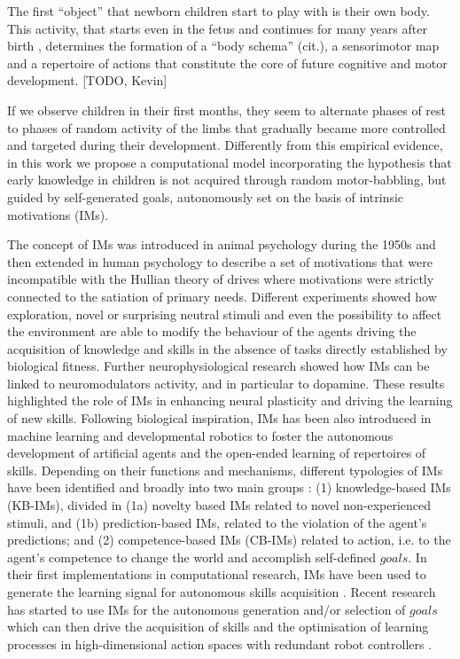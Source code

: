 The first ``object'' that newborn children start to play with is their own body. This activity, that starts even in the fetus and continues for many years after birth \citep{Bremner2008}, determines the formation of a ``body schema'' (cit.), a sensorimotor map and a repertoire of actions that constitute the core of future cognitive and motor development. [TODO, Kevin]

If we observe children in their first months, they seem to alternate phases of rest to phases of random activity of the limbs that gradually became more controlled and targeted during their development. Differently from this empirical evidence, in this work we propose a computational model incorporating the hypothesis that early knowledge in children is not acquired through random motor-babbling, but guided by self-generated goals, autonomously set on the basis of intrinsic motivations (IMs).

The concept of IMs was introduced in animal psychology during the 1950s and then extended in human psychology \citep{Berlyne1950,White1959,Berlyne1960,deci1985,Ryan2000}  to describe a set of motivations that were incompatible with the Hullian theory of drives \citep{Hull1943} where motivations were strictly connected to the satiation of primary needs. Different experiments \citep[e.g.][]{Harlow1950,Montgomery1954,Kish1955,Glow1978} showed how exploration, novel or surprising neutral stimuli and even the possibility to affect the environment are able to modify the behaviour of the agents driving the acquisition of knowledge and skills in the absence of tasks directly established by biological fitness. Further neurophysiological research \citep[e.g.][]{Chiodo1980,Horvitz2000,Redgrave2006} showed how IMs can be linked to neuromodulators activity, and in particular to dopamine. These results highlighted the role of IMs in enhancing neural plasticity and driving the learning of new skills. Following biological inspiration, IMs has been also introduced in machine learning \citep[e.g.][]{Barto2004,Schmidhuber2010} and developmental robotics \citep[e.g.][]{Oudeyer2007a,BaldassarreMirolliBook} to foster the autonomous development of artificial agents and the open-ended learning of repertoires of skills. Depending on their functions and mechanisms, different typologies of IMs have been identified \citep{Oudeyer2007b,Santucci2013a,Barto2013} and broadly into two main groups \citep{Baldassarre2014}: (1) knowledge-based IMs (KB-IMs), divided in (1a) novelty based IMs related to novel non-experienced stimuli, and (1b) prediction-based IMs, related to the violation of the agent's predictions; and (2) competence-based IMs (CB-IMs) related to action, i.e. to the agent's competence to change the world and accomplish self-defined $goals$. In their first implementations in computational research, IMs have been used to generate the learning signal for autonomous skills acquisition \citep{Oudeyer2007a,Hart2011,Mirolli2013,Kompella2015}. Recent research has started to use IMs for the autonomous generation and/or selection of $goals$ which can then drive the acquisition of skills \citep{Merrick2012,Baranes2013,Santucci2016} and the optimisation of learning processes in high-dimensional action spaces with redundant robot controllers \citep{Baranes2013,Rolf2014}.

